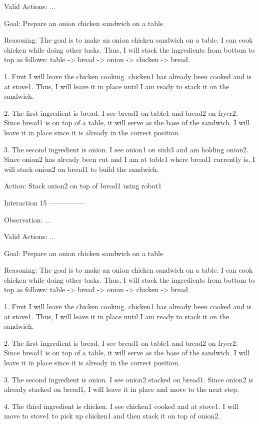 Valid Actions: ...

Goal: Prepare an onion chicken sandwich on a table


Reasoning: The goal is to make an onion chicken sandwich on a table. I can cook chicken while doing other tasks. Thus, I
will stack the ingredients from bottom to top as follows: table -> bread -> onion -> chicken -> bread.

1. First I will leave the chicken cooking. chicken1 has already been cooked and is at stove1. Thus, I will leave it in place until I am ready to stack it on the sandwich.

2. The first ingredient is bread. I see bread1 on table1 and bread2 on fryer2. Since bread1 is on top of a table, it will serve as the base of the sandwich. I will leave it in place since it is already in the correct position.

3. The second ingredient is onion. I see onion1 on sink3 and am holding onion2. Since onion2 has already been cut and I am at table1 where bread1 currently is, I will stack onion2 on bread1 to build the sandwich.

Action: Stack onion2 on top of bread1 using robot1


Interaction 15
---------------


Observation: ...

Valid Actions: ...

Goal: Prepare an onion chicken sandwich on a table


Reasoning: The goal is to make an onion chicken sandwich on a table. I can cook chicken while doing other tasks. Thus, I
will stack the ingredients from bottom to top as follows: table -> bread -> onion -> chicken -> bread.

1. First I will leave the chicken cooking. chicken1 has already been cooked and is at stove1. Thus, I will leave it in place until I am ready to stack it on the sandwich.

2. The first ingredient is bread. I see bread1 on table1 and bread2 on fryer2. Since bread1 is on top of a table, it will serve as the base of the sandwich. I will leave it in place since it is already in the correct position.

3. The second ingredient is onion. I see onion2 stacked on bread1. Since onion2 is already stacked on bread1, I will leave it in place and move to the next step.

4. The third ingredient is chicken. I see chicken1 cooked and at stove1. I will move to stove1 to pick up chicken1 and then stack it on top of onion2.


